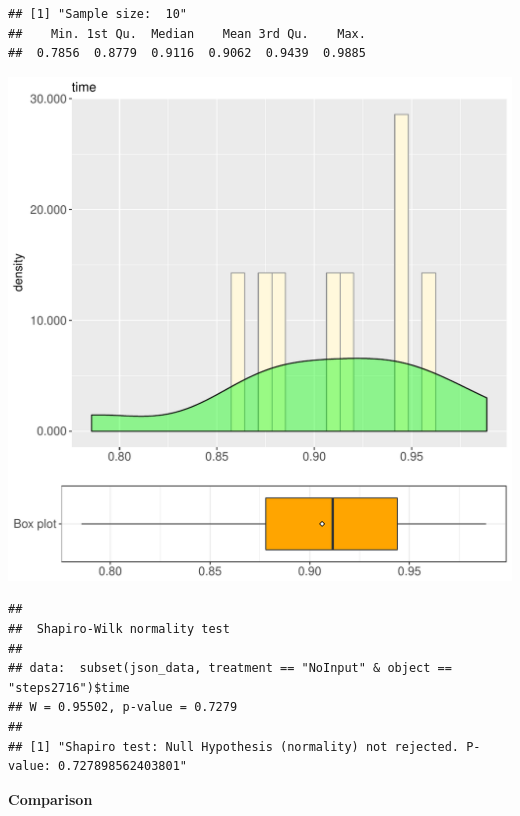 \documentclass{article}\usepackage[]{graphicx}\usepackage[]{color}
\makeatletter
\def\maxwidth{ %
  \ifdim\Gin@nat@width>\linewidth
    \linewidth
  \else
    \Gin@nat@width
  \fi
}
\newenvironment{kframe}{%
 \def\at@end@of@kframe{}%
 \ifinner\ifhmode%
  \def\at@end@of@kframe{\end{minipage}}%
  \begin{minipage}{\columnwidth}%
 \fi\fi%
 \def\FrameCommand##1{\hskip\@totalleftmargin \hskip-\fboxsep
 \colorbox{shadecolor}{##1}\hskip-\fboxsep
     \hskip-\linewidth \hskip-\@totalleftmargin \hskip\columnwidth}%
 \MakeFramed {\advance\hsize-\width
   \@totalleftmargin\z@ \linewidth\hsize
   \@setminipage}}%
 {\par\unskip\endMakeFramed%
 \at@end@of@kframe}
\newenvironment{knitrout}{}{} %
\makeatother
\begin{document}
\begin{knitrout}
\color{fgcolor}\begin{kframe}
\begin{verbatim}
## [1] "Sample size:  10"
##    Min. 1st Qu.  Median    Mean 3rd Qu.    Max. 
##  0.7856  0.8779  0.9116  0.9062  0.9439  0.9885
\end{verbatim}
\end{kframe}
\includegraphics[width=\maxwidth]{figure/RH4_NoInput_steps2716-1} 
\begin{kframe}\begin{verbatim}
## 
## 	Shapiro-Wilk normality test
## 
## data:  subset(json_data, treatment == "NoInput" & object == "steps2716")$time
## W = 0.95502, p-value = 0.7279
## 
## [1] "Shapiro test: Null Hypothesis (normality) not rejected. P-value: 0.727898562403801"
\end{verbatim}
\end{kframe}
\end{knitrout}
  
 \textbf{Comparison}
  
\end{document}
